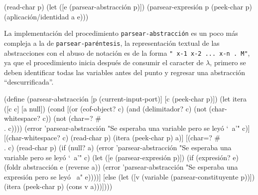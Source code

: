\documentclass[letterpaper,twoside,openright,11pt]{book}
\begin{document}
\nwenddocs{}\endmoddef
(read-char p)
(let ([e (parsear-abstracción p)])
  (parsear-expresión p (peek-char p) (aplicación/identidad a e)))
\nwendcode{}\nwdocspar

La implementación del procedimiento {\tt{}parsear-\protect{}abstracción\protect{}} es un poco más compleja a la de {\tt{}\protect{}parsear-paréntesis}, la representación textual de las abstracciones con el abuso de notación es de la forma {\tt{}"{}\ x-1\ x-2\ ...\ x-n\ .\ M"}, ya que el procedimiento inicia después de consumir el caracter de \( λ \), primero se deben identificar todas las variables antes del punto y regresar una abstracción ``descurrificada''.

\nwenddocs{}\plusendmoddef
(define (parsear-abstracción [p (current-input-port)]
                             [c (peek-char p)])
  (let itera ([c c]
              [a null])
    (cond [(or (eof-object? c)
               (and (delimitador? c) (not (char-whitespace? c)) (not (char=? #\\. c))))
           (error 'parsear-abstracción
                  "Se esperaba una variable pero se leyó `~a'" c)]
          [(char-whitespace? c)
           (read-char p)
           (itera (peek-char p) a)]
          [(char=? #\\. c)
           (read-char p)
           (if (null? a)
               (error 'parsear-abstracción
                      "Se esperaba una variable pero se leyó `~a'" c)
               (let ([e (parsear-expresión p)])
                 (if (expresión? e)
                     (foldr abstracción e (reverse a))
                     (error 'parsear-abstracción
                            "Se esperaba una expresión pero se leyó ~a" e))))]
          [else
           (let ([v (variable (parsear-constituyente p))])
             (itera (peek-char p) (cons v a)))])))
\end{document}
